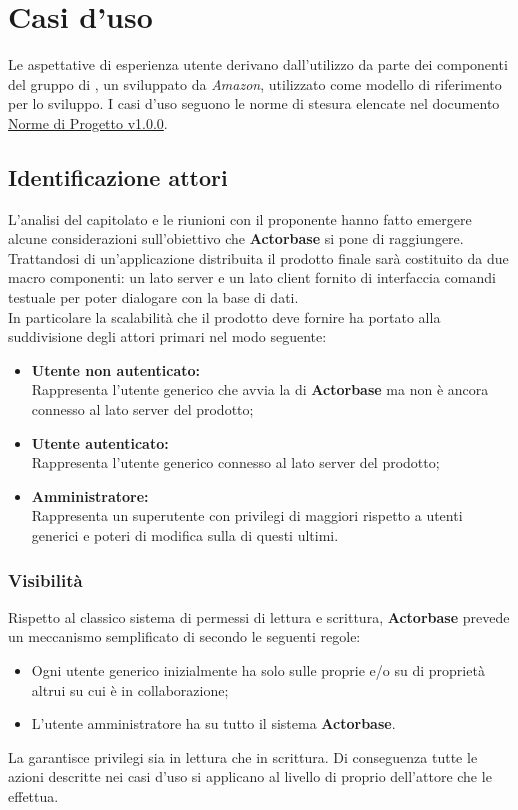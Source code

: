 \documentclass{scalatekids-article}
\begin{document}
\section{Casi d'uso}
Le aspettative di esperienza utente derivano dall'utilizzo da parte dei
componenti del gruppo di , un  
sviluppato da \textit{Amazon}, utilizzato come modello di riferimento per lo sviluppo. I casi d'uso seguono le norme di stesura elencate nel documento \href{run:../Interni/NormeDiProgetto\_v1.0.0.pdf}{Norme di Progetto v1.0.0}.
\subsection{Identificazione attori}
L'analisi del capitolato e le riunioni con il proponente hanno fatto emergere
alcune considerazioni sull'obiettivo che \textbf{Actorbase} si pone di raggiungere.
Trattandosi di un'applicazione distribuita il prodotto finale sarà costituito
da due macro componenti: un lato server e un lato client fornito di interfaccia
comandi testuale per poter dialogare con la base di dati.\\ In particolare la
scalabilità che il prodotto deve fornire ha portato alla suddivisione degli
attori primari nel modo seguente:\\
\begin{itemize}
\item\textbf{Utente non autenticato:}\\
  Rappresenta l'utente generico che avvia la  di \textbf{Actorbase} ma non è ancora connesso al lato server del prodotto;
\item\textbf{Utente autenticato:}\\
  Rappresenta l'utente generico connesso al lato server del prodotto;
\item\textbf{Amministratore:}\\
  Rappresenta un superutente con privilegi di  maggiori rispetto a utenti generici e poteri di modifica sulla  di questi ultimi.
\end{itemize}
\subsubsection{Visibilità}
Rispetto al classico sistema di permessi di lettura e scrittura, \textbf{Actorbase}
prevede un meccanismo semplificato di  secondo le seguenti regole:
\begin{itemize}
\item Ogni utente generico inizialmente ha  solo sulle proprie  e/o su  di proprietà altrui su cui è in collaborazione;
\item L'utente amministratore ha  su tutto il sistema \textbf{Actorbase}.
\end{itemize}
La  garantisce privilegi sia in lettura che in scrittura. Di
conseguenza tutte le azioni descritte nei casi d'uso si applicano al livello di
 proprio dell'attore che le effettua.
\end{document}
